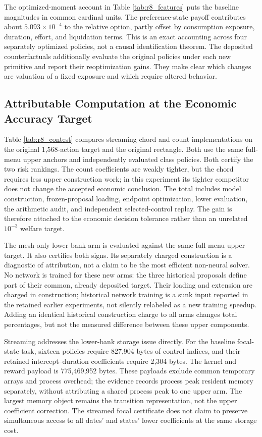 
The optimized-moment account in Table \ref{tab:r8_features} puts the baseline magnitudes in common cardinal units. The preference-state payoff contributes about $5.093\times10^{-4}$ to the relative option, partly offset by consumption exposure, duration, effort, and liquidation terms. This is an exact accounting across four separately optimized policies, not a causal identification theorem. The deposited counterfactuals additionally evaluate the original policies under each new primitive and report their reoptimization gains. They make clear which changes are valuation of a fixed exposure and which require altered behavior.

\subsection{Attributable Computation at the Economic Accuracy Target}

Table \ref{tab:r8_contest} compares streaming chord and count implementations on the original 1,568-action target and the original rectangle. Both use the same full-menu upper anchors and independently evaluated class policies. Both certify the two risk rankings. The count coefficients are weakly tighter, but the chord requires less upper construction work; in this experiment its tighter competitor does not change the accepted economic conclusion. The total includes model construction, frozen-proposal loading, endpoint optimization, lower evaluation, the arithmetic audit, and independent selected-control replay. The gain is therefore attached to the economic decision tolerance rather than an unrelated $10^{-3}$ welfare target.

The mesh-only lower-bank arm is evaluated against the same full-menu upper target. It also certifies both signs. Its separately charged construction is a diagnostic of attribution, not a claim to be the most efficient non-neural solver. No network is trained for these new arms: the three historical proposals define part of their common, already deposited target. Their loading and extension are charged in construction; historical network training is a sunk input reported in the retained earlier experiments, not silently relabeled as a new training speedup. Adding an identical historical construction charge to all arms changes total percentages, but not the measured difference between these upper components.

Streaming addresses the lower-bank storage issue directly. For the baseline focal-state task, sixteen policies require 827,904 bytes of control indices, and their retained intercept--duration coefficients require 2,304 bytes. The kernel and reward payload is 775,469,952 bytes. These payloads exclude common temporary arrays and process overhead; the evidence records process peak resident memory separately, without attributing a shared process peak to one upper arm. The largest memory object remains the transition representation, not the upper coefficient correction. The streamed focal certificate does not claim to preserve simultaneous access to all dates' and states' lower coefficients at the same storage cost.

